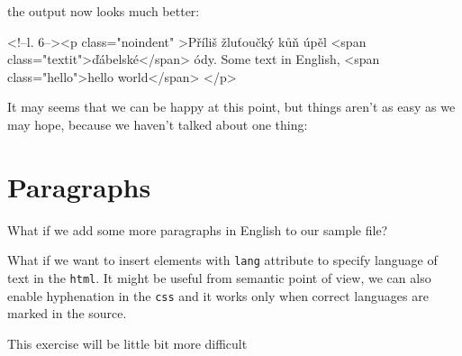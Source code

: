the output now looks much better:

\begin{htmlsource}
<!--l. 6--><p class="noindent" >Příliš žluťoučký kůň úpěl <span class="textit">ďábelské</span> ódy. Some text in English, <span class="hello">hello world</span>
</p> 
\end{htmlsource}

It may seems that we can be happy at this point, but things aren't as
easy as we may hope, because we haven't talked about one thing:

\hypertarget{paragraphs}{%
\section{Paragraphs}\label{paragraphs}}

What if we add some more paragraphs in English to our sample file?


What if we want to insert elements with \texttt{lang} attribute to
specify language of text in the \texttt{html}. It might be useful from
semantic point of view, we can also enable hyphenation in the
\texttt{css} and it works only when correct languages are marked in the
source.

This exercise will be little bit more difficult
